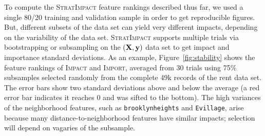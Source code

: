 \documentclass[11pt]{article}
\newcommand{\figref}[1]{Figure~\ref{#1}}
\newcommand{\Imp}{\fontfamily{cmr}\textsc{Impact}}
\newcommand{\Impo}{\fontfamily{cmr}\textsc{Import}}
\newcommand{\simp}{\fontfamily{cmr}\textsc{\small StratImpact}}
\begin{document}
To compute the \simp{} feature rankings described thus far, we used a single 80/20 training and validation sample in order to get reproducible figures.  But, different subsets of the data set can yield very different impacts, depending on the variability of the data set. \simp{} supports multiple trials via bootstrapping or subsampling on the $(\bf X, y)$ data set to get impact and importance standard deviations.  As an example, \figref{fig:stability} shows the  feature rankings of \Imp{} and \Impo{}, averaged from 30 trials using 75\% subsamples selected randomly from the complete 49k records of the rent data set. The error bars show two standard deviations above and below the average (a red error bar indicates it reaches 0 and was sifted to the bottom).  The high variances of the neighborhood features, such as {\tt brooklynheights} and {\tt Evillage}, arise because many distance-to-neighborhood features have similar impacts; selection will depend on vagaries of the subsample.
 
\end{document}
